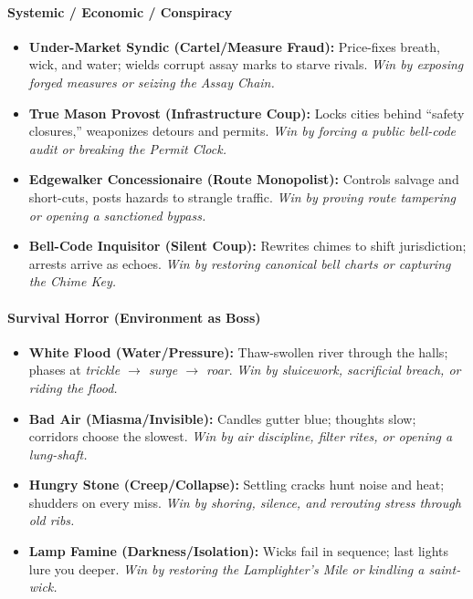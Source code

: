 \paragraph{Systemic / Economic / Conspiracy}
\begin{itemize}
  \item \textbf{Under-Market Syndic (Cartel/Measure Fraud):} Price-fixes breath, wick, and water; wields corrupt assay marks to starve rivals. \emph{Win by exposing forged measures or seizing the Assay Chain.}
  \item \textbf{True Mason Provost (Infrastructure Coup):} Locks cities behind “safety closures,” weaponizes detours and permits. \emph{Win by forcing a public bell-code audit or breaking the Permit Clock.}
  \item \textbf{Edgewalker Concessionaire (Route Monopolist):} Controls salvage and short-cuts, posts hazards to strangle traffic. \emph{Win by proving route tampering or opening a sanctioned bypass.}
  \item \textbf{Bell-Code Inquisitor (Silent Coup):} Rewrites chimes to shift jurisdiction; arrests arrive as echoes. \emph{Win by restoring canonical bell charts or capturing the Chime Key.}
\end{itemize}

\paragraph{Survival Horror (Environment as Boss)}
\begin{itemize}
  \item \textbf{White Flood (Water/Pressure):} Thaw-swollen river through the halls; phases at \emph{trickle $\rightarrow$ surge $\rightarrow$ roar}. \emph{Win by sluicework, sacrificial breach, or riding the flood.}
  \item \textbf{Bad Air (Miasma/Invisible):} Candles gutter blue; thoughts slow; corridors choose the slowest. \emph{Win by air discipline, filter rites, or opening a lung-shaft.}
  \item \textbf{Hungry Stone (Creep/Collapse):} Settling cracks hunt noise and heat; shudders on every miss. \emph{Win by shoring, silence, and rerouting stress through old ribs.}
  \item \textbf{Lamp Famine (Darkness/Isolation):} Wicks fail in sequence; last lights lure you deeper. \emph{Win by restoring the Lamplighter’s Mile or kindling a saint-wick.}
\end{itemize}

